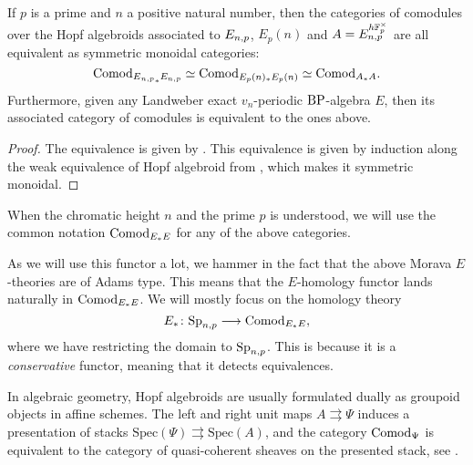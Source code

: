 \begin{proposition}
    If $p$ is a prime and $n$ a positive natural number, then the categories of comodules over the Hopf algebroids associated to $E_{n,p}$, $E_p(n)$ and $A = E_{n,p}^{h\mathbb{F}_p^\times}$ are all equivalent as symmetric monoidal categories: 
    \[\mathrm{Comod}_{E{_{n,p}}_*E_{n,p}}\simeq \mathrm{Comod}_{E_p(n)_*E_p(n)}\simeq \mathrm{Comod}_{A_*A}.\]
    Furthermore, given any Landweber exact $v_n$-periodic $\mathrm{BP}$-algebra $E$, then its associated category of comodules is equivalent to the ones above. 
\end{proposition}
\begin{proof}
    The equivalence is given by \cite[4.2]{hovey-strickland_2005a}. This equivalence is given by induction along the weak equivalence of Hopf algebroid from \cite[6.5]{hovey-strickland_2005a}, which makes it symmetric monoidal. 
\end{proof}

\begin{notation}
    When the chromatic height $n$ and the prime $p$ is understood, we will use the common notation $\mathrm{Comod}_{E_*E}$ for any of the above categories. 
\end{notation}

\begin{example}
    \label{ch0:ex:E-homology-functor}
    As we will use this functor a lot, we hammer in the fact that the above Morava $E$-theories are of Adams type. This means that the $E$-homology functor lands naturally in $\mathrm{Comod}_{E_*E}$. We will mostly focus on the homology theory
    \[E_*\colon \mathrm{Sp}_{n,p} \longrightarrow \mathrm{Comod}_{E_*E},\]
    where we have restricting the domain to $\mathrm{Sp}_{n,p}$. This is because it is a \emph{conservative} functor, meaning that it detects equivalences. 
\end{example}

\begin{remark}
    \label{ch0:rm:presenting-stacks}
    In algebraic geometry, Hopf algebroids are usually formulated dually as groupoid objects in affine schemes. The left and right unit maps $A\rightrightarrows \Psi$ induces a presentation of stacks $\mathrm{Spec}(\Psi)\rightrightarrows \mathrm{Spec}(A)$, and the category $\mathrm{Comod}_\Psi$ is equivalent to the category of quasi-coherent sheaves on the presented stack, see \cite[Thm 8]{naumann_07}. 
\end{remark}

